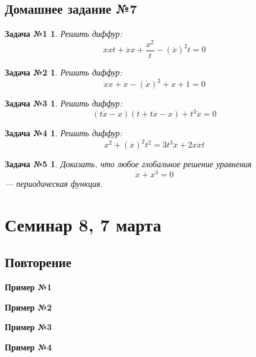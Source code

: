 \documentclass[a4paper,12pt]{article}
\newtheorem*{task1}{Задача №1}
\newtheorem*{task2}{Задача №2}
\newtheorem*{task3}{Задача №3}
\newtheorem*{task4}{Задача №4}
\newtheorem*{task5}{Задача №5}
\newcommand{\dx}{\dot{x}}
\newcommand{\ddx}{\ddot{x}}
\begin{document}
\subsection{Домашнее задание №7}

\begin{task1}
	Решить диффур:
	\[\ddx x t + \dx x + \dfrac{x^2}{t} - (\dx)^2t = 0\]
\end{task1}
%

\begin{task2}
	Решить диффур:
	\[\ddx x + \ddx - (\dx)^2 + x + 1 = 0\]
\end{task2}
%

\begin{task3}
	Решить диффур:
	\[(t\dx - x)(t + t\dx - x) + t^3\ddx = 0\]
\end{task3}
%	

\begin{task4}
	Решить диффур:
	\[x^2 + (\dx)^2t^2 = 3t^3\ddx + 2x\dx t\]
\end{task4}
%

\begin{task5}
	Доказать, что любое глобальное решение уравнения \[\ddx + x^3 = 0\] --- периодическая функция.
\end{task5}
%	

\newpage
\section{Семинар 8, 7 марта}

\subsection{Повторение}

\textbf{Пример №1}

\textbf{Пример №2}

\textbf{Пример №3}

\textbf{Пример №4}
\end{document}
